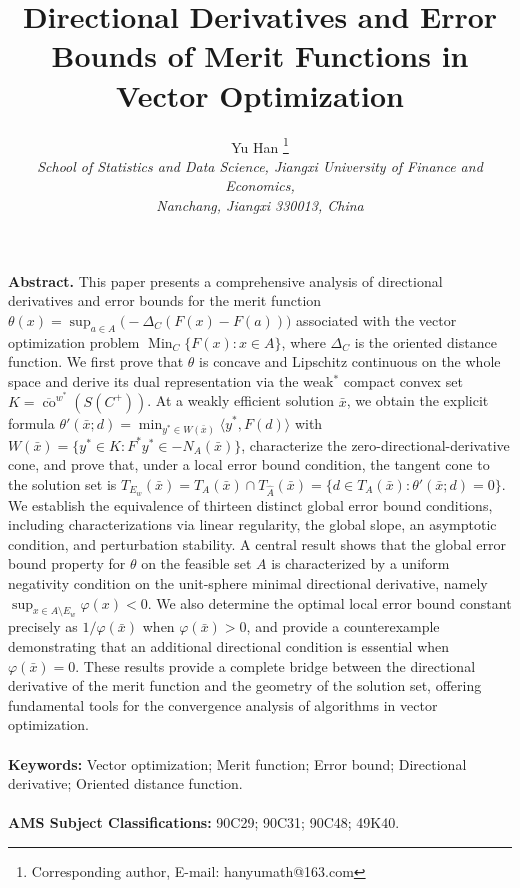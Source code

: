 \documentclass[11pt]{article}
\begin{document}
\title{{ Directional Derivatives and Error Bounds of Merit Functions in Vector Optimization }}
\author{{Yu Han \footnote{Corresponding author,  E-mail: hanyumath@163.com}}\\
{\small\it School of Statistics and Data Science, Jiangxi University of Finance and Economics, }\\
{\small\it  Nanchang, Jiangxi 330013,  China} }
\date{}
\maketitle
\vspace*{-9mm}
\begin{center}
\begin{minipage}{6.2in}
{\bf Abstract.}    This paper presents a comprehensive analysis of directional derivatives and error bounds for the merit function $\theta(x)=\sup_{a\in A}\bigl(-\Delta_C(F(x)-F(a))\bigr)$ associated with the vector optimization problem $\operatorname{Min}_C\{F(x):x\in A\}$, where $\Delta_C$ is the  oriented distance function.   We first prove that $\theta$ is concave and Lipschitz continuous on the whole space and derive its dual representation via the weak$^*$ compact convex set $K=\overline{\operatorname{co}}^{w^*}(S(C^+))$.  
At a weakly efficient solution $\bar x$, we obtain the explicit formula
$\theta'(\bar x;d)=\min_{y^*\in W(\bar x)}\langle y^*,F(d)\rangle$ with \(W(\bar{x})=\{y^*\in K:F^*y^*\in -N_A(\bar{x})\}\), characterize the zero-directional-derivative cone, and prove that, under a local error bound condition, the tangent cone to the solution set is
$T_{E_w}(\bar x)=T_A(\bar x)\cap T_{\widehat A}(\bar x)=\{d\in T_A(\bar x):\theta'(\bar x;d)=0\}$.  
We establish the equivalence of thirteen distinct global error bound conditions, including characterizations via linear regularity, the global slope, an asymptotic   condition, and perturbation stability.
A central result shows that the global error bound property for \(\theta\) on the feasible set \(A\) is   characterized by a uniform negativity condition on the unit-sphere minimal directional derivative, namely \(\sup_{x \in A \setminus E_w} \varphi(x) < 0\).
We also determine the optimal local error bound constant precisely as $1/\varphi(\bar x)$ when $\varphi(\bar x)>0$, and provide a counterexample demonstrating that an additional directional condition is essential when $\varphi(\bar x)=0$.  
These results provide a complete bridge between the directional derivative of the merit function and the geometry of the solution set, offering fundamental tools for the convergence analysis of algorithms in vector optimization.
   \\ \ \\
{\bf Keywords:} Vector optimization; Merit function; Error bound; Directional derivative; Oriented distance function.
\\ \ \\
{\bf AMS Subject Classifications:}  90C29; 90C31; 90C48; 49K40.

\end{minipage}
\end{center}
\end{document}
